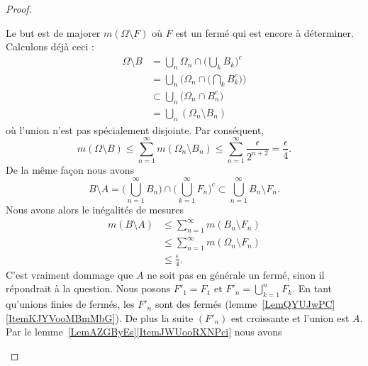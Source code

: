 \begin{proof}
\begin{subproof}
\begin{subproof}
                    Le but est de majorer \( m(\Omega\setminus F)\) où \( F\) est un fermé qui est encore à déterminer. Calculons déjà ceci :
                    \begin{subequations}
                        \begin{align}
                            \Omega\setminus B&=\bigcup_n\Omega_n\cap\big( \bigcup_kB_k \big)^c\\
                            &=\bigcup_n\Big( \Omega_n\cap\big( \bigcap_kB_k^c \big) \Big)\\
                            &\subset\bigcup_n\big( \Omega_n\cap B_n^c \big)\\
                            &=\bigcup_n(\Omega_n\setminus B_n)
                        \end{align}
                    \end{subequations}
                    où l'union n'est pas spécialement disjointe. Par conséquent,
                    \begin{equation}
                        m(\Omega\setminus B)\leq \sum_{n=1}^{\infty}m(\Omega_n\setminus B_n)\leq \sum_{n=1}^{\infty}\frac{ \epsilon }{ 2^{n+2} }=\frac{ \epsilon }{ 4 }.
                    \end{equation}
                    De la même façon nous avons
                    \begin{equation}
                        B\setminus A=\big( \bigcup_{n=1}^{\infty}B_n \big)\cap\big( \bigcup_{k=1}^{\infty}F_n \big)^c\subset \bigcup_{n=1}^{\infty}B_n\setminus F_n.
                    \end{equation}
                    Nous avons alors le inégalités de mesures
                    \begin{subequations}
                        \begin{align}
                            m(B\setminus A)&\leq \sum_{n=1}^{\infty}m(B_n\setminus F_n)\\
                            &\leq\sum_{n=1}^{\infty}m(\Omega_n\setminus F_n)\\
                            &\leq \frac{ \epsilon }{ 4 }.
                        \end{align}
                    \end{subequations}
                    C'est vraiment dommage que \( A\) ne soit pas en générale un fermé, sinon il répondrait à la question. Nous posons \( F'_1=F_1\) et \( F'_n=\bigcup_{k=1}^nF_k\). En tant qu'unions finies de fermés, les \( F'_n\) sont des fermés (lemme~\ref{LemQYUJwPC}\ref{ItemKJYVooMBmMbG}). De plus la suite \( (F'_n)\)  est croissante et l'union est \( A\). Par le lemme~\ref{LemAZGByEs}\ref{ItemJWUooRXNPci} nous avons

\end{subproof}
\end{subproof}
\end{proof}
